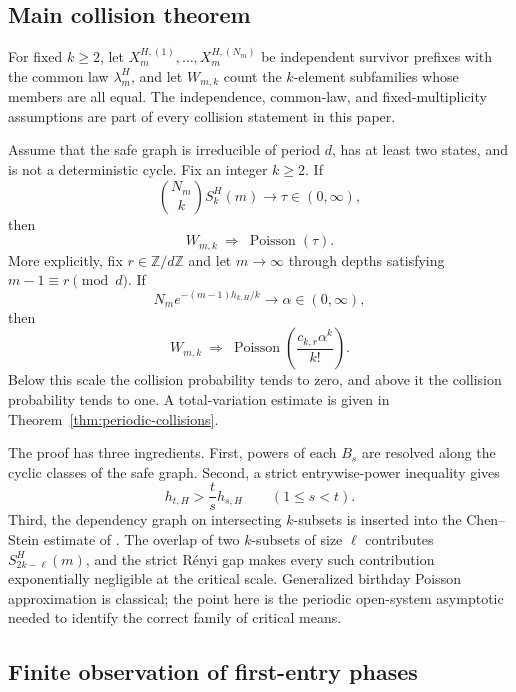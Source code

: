 \subsection*{Main collision theorem}

For fixed \(k\geq2\), let
\(X_m^{H,(1)},\ldots,X_m^{H,(N_m)}\) be independent survivor prefixes
with the common law \(\lambda_m^H\), and let \(W_{m,k}\) count the
\(k\)-element subfamilies whose members are all equal.  The independence,
common-law, and fixed-multiplicity assumptions are part of every
collision statement in this paper.

\begin{theorem}
\label{thm:intro-collisions}
Assume that the safe graph is irreducible of period \(d\), has at least
two states, and is not a deterministic cycle.  Fix an integer
\(k\geq2\).  If
\[
  \binom{N_m}{k}S_k^H(m)\longrightarrow\tau\in(0,\infty),
\]
then
\[
  W_{m,k}\ \Rightarrow\ \operatorname{Poisson}(\tau).
\]
More explicitly, fix \(r\in\mathbb Z/d\mathbb Z\) and let
\(m\to\infty\) through depths satisfying \(m-1\equiv r\pmod d\).  If
\[
  N_m e^{-(m-1)h_{k,H}/k}\longrightarrow\alpha\in(0,\infty),
\]
then
\[
  W_{m,k}\ \Rightarrow\
  \operatorname{Poisson}\!\left(\frac{c_{k,r}\alpha^k}{k!}\right).
\]
Below this scale the collision probability tends to zero, and above it
the collision probability tends to one.  A total-variation estimate is
given in Theorem~\ref{thm:periodic-collisions}.
\end{theorem}

The proof has three ingredients.  First, powers of each \(B_s\) are
resolved along the cyclic classes of the safe graph.  Second, a strict
entrywise-power inequality gives
\[
  h_{t,H}>\frac{t}{s}h_{s,H}
  \qquad (1\leq s<t).
\]
Third, the dependency graph on intersecting \(k\)-subsets is inserted
into the Chen--Stein estimate of
\citet{ArratiaGoldsteinGordon1989}.  The overlap of two \(k\)-subsets
of size \(\ell\) contributes \(S_{2k-\ell}^H(m)\), and the strict
R\'enyi gap makes every such contribution exponentially negligible at
the critical scale.  Generalized birthday Poisson approximation is
classical; the point here is the periodic open-system asymptotic needed
to identify the correct family of critical means.

\subsection*{Finite observation of first-entry phases}

